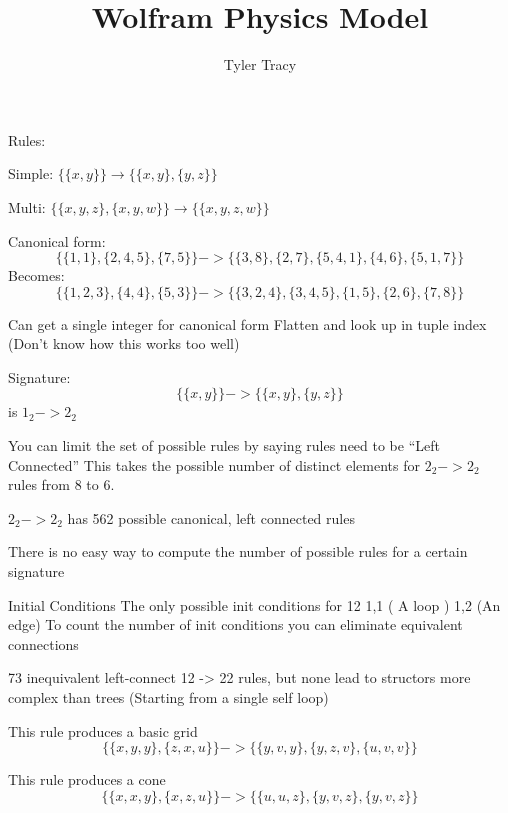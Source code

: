 \documentclass{article}
\title{Wolfram Physics Model}
\author{Tyler Tracy}
\begin{document}
\maketitle


Rules:

Simple: $\{\{x,y\}\} \rightarrow \{\{x,y\}, \{y,z\}\} $

Multi: $\{\{x,y,z\}, \{x,y,w\}\} \rightarrow \{\{x,y,z,w\}\}$ 

Canonical form:
$$\{\{1, 1\}, \{2, 4, 5\}, \{7, 5\}\} -> \{\{3, 8\}, \{2, 7\}, \{5, 4, 1\}, \{4, 6\}, \{5,1, 7\}\}$$
Becomes:
$$\{\{1,2,3\},\{4,4\},\{5,3\}\} -> \{\{3,2,4\}, \{3,4,5\},\{1,5\},\{2,6\}, \{7,8\}\}$$

Can get a single integer for canonical form Flatten and look up in tuple index (Don’t know how this works too well)

Signature:
$$ \{\{x,y\}\} -> \{\{x,y\}, \{y,z\}\} $$ is $1_2 -> 2_2$


You can limit the set of possible rules by saying rules need to be “Left Connected”
This takes the possible number of distinct elements for $2_2 -> 2_2$ rules from 8 to 6. 

$2_2 -> 2_2$ has 562 possible canonical, left connected rules

There is no easy way to compute the number of possible rules for a certain signature


Initial Conditions
The only possible init conditions for 12 {{1,1}} ( A loop ) {{1,2}} (An edge)
To count the number of init conditions you can eliminate equivalent connections


73 inequivalent left-connect 12 -> 22 rules, but none lead to structors more complex than trees (Starting from a single self loop)


This rule produces a basic grid
$$\{\{x, y, y\}, \{z, x, u\}\} -> \{\{y, v, y\}, \{y, z, v\}, \{u, v, v\}\}$$

This rule produces a cone
$$\{\{x, x, y\}, \{x, z, u\}\} -> \{\{u, u, z\}, \{y, v, z\}, \{y, v, z\}\}$$
\end{document}
